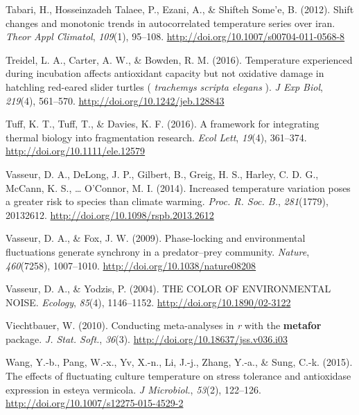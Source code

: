 \documentclass[12pt,twoside]{reedthesis}
\begin{document}
\leavevmode\hypertarget{ref-tabari_shift_2012}{}%
Tabari, H., Hosseinzadeh Talaee, P., Ezani, A., \& Shifteh Some'e, B. (2012). Shift changes and monotonic trends in autocorrelated temperature series over iran. \emph{Theor Appl Climatol}, \emph{109}(1), 95--108. \url{http://doi.org/10.1007/s00704-011-0568-8}

\leavevmode\hypertarget{ref-treidel_temperature_2016-1}{}%
Treidel, L. A., Carter, A. W., \& Bowden, R. M. (2016). Temperature experienced during incubation affects antioxidant capacity but not oxidative damage in hatchling red-eared slider turtles ( \emph{trachemys scripta elegans} ). \emph{J Exp Biol}, \emph{219}(4), 561--570. \url{http://doi.org/10.1242/jeb.128843}

\leavevmode\hypertarget{ref-tuff_framework_2016}{}%
Tuff, K. T., Tuff, T., \& Davies, K. F. (2016). A framework for integrating thermal biology into fragmentation research. \emph{Ecol Lett}, \emph{19}(4), 361--374. \url{http://doi.org/10.1111/ele.12579}

\leavevmode\hypertarget{ref-vasseur_increased_2014}{}%
Vasseur, D. A., DeLong, J. P., Gilbert, B., Greig, H. S., Harley, C. D. G., McCann, K. S., \ldots{} O'Connor, M. I. (2014). Increased temperature variation poses a greater risk to species than climate warming. \emph{Proc. R. Soc. B.}, \emph{281}(1779), 20132612. \url{http://doi.org/10.1098/rspb.2013.2612}

\leavevmode\hypertarget{ref-vasseur_phase-locking_2009}{}%
Vasseur, D. A., \& Fox, J. W. (2009). Phase-locking and environmental fluctuations generate synchrony in a predator--prey community. \emph{Nature}, \emph{460}(7258), 1007--1010. \url{http://doi.org/10.1038/nature08208}

\leavevmode\hypertarget{ref-vasseur_color_2004}{}%
Vasseur, D. A., \& Yodzis, P. (2004). THE COLOR OF ENVIRONMENTAL NOISE. \emph{Ecology}, \emph{85}(4), 1146--1152. \url{http://doi.org/10.1890/02-3122}

\leavevmode\hypertarget{ref-viechtbauer_conducting_2010}{}%
Viechtbauer, W. (2010). Conducting meta-analyses in \emph{r} with the \textbf{metafor} package. \emph{J. Stat. Soft.}, \emph{36}(3). \url{http://doi.org/10.18637/jss.v036.i03}

\leavevmode\hypertarget{ref-wang_effects_2015}{}%
Wang, Y.-b., Pang, W.-x., Yv, X.-n., Li, J.-j., Zhang, Y.-a., \& Sung, C.-k. (2015). The effects of fluctuating culture temperature on stress tolerance and antioxidase expression in esteya vermicola. \emph{J Microbiol.}, \emph{53}(2), 122--126. \url{http://doi.org/10.1007/s12275-015-4529-2}
\end{document}
